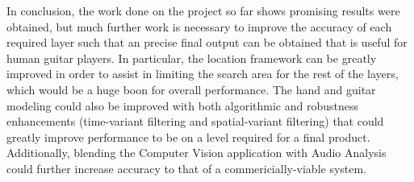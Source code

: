 In conclusion, the work done on the project so far shows promising results were obtained,
but much further work is necessary to improve the accuracy of each required layer such that
an precise final output can be obtained that is useful for human guitar players.
In particular, the location framework can be greatly improved in order to assist in
limiting the search area for the rest of the layers, which would be a huge boon for overall
performance. The hand and guitar modeling could also be improved with both algorithmic and
robustness enhancements (time-variant filtering and spatial-variant filtering) that could
greatly improve performance to be on a level required for a final product.
Additionally, blending the Computer Vision application with Audio Analysis could further
increase accuracy to that of a commericially-viable system.
